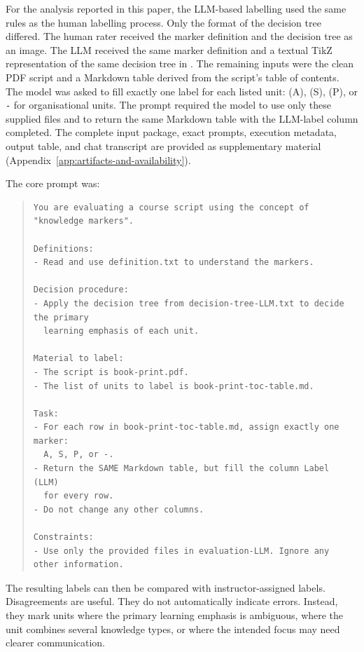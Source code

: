 \documentclass{article}
\begin{document}
For the analysis reported in this paper, the LLM-based labelling used the same rules as the human labelling process. Only the format of the decision tree differed. The human rater received the marker definition and the decision tree as an image. The LLM received the same marker definition and a textual TikZ representation of the same decision tree in . The remaining inputs were the clean PDF script and a Markdown table derived from the script's table of contents. The model was asked to fill exactly one label for each listed unit: (A), (S), (P), or \texttt{-} for organisational units. The prompt required the model to use only these supplied files and to return the same Markdown table with the LLM-label column completed. The complete input package, exact prompts, execution metadata, output table, and chat transcript are provided as supplementary material (Appendix~\ref{app:artifacts-and-availability}).\par

The core prompt was:

\begin{quote}
\small
\begin{verbatim}
You are evaluating a course script using the concept of "knowledge markers".

Definitions:
- Read and use definition.txt to understand the markers.

Decision procedure:
- Apply the decision tree from decision-tree-LLM.txt to decide the primary
  learning emphasis of each unit.

Material to label:
- The script is book-print.pdf.
- The list of units to label is book-print-toc-table.md.

Task:
- For each row in book-print-toc-table.md, assign exactly one marker:
  A, S, P, or -.
- Return the SAME Markdown table, but fill the column Label (LLM)
  for every row.
- Do not change any other columns.

Constraints:
- Use only the provided files in evaluation-LLM. Ignore any other information.
\end{verbatim}
\end{quote}

The resulting labels can then be compared with instructor-assigned labels. Disagreements are useful. They do not automatically indicate errors. Instead, they mark units where the primary learning emphasis is ambiguous, where the unit combines several knowledge types, or where the intended focus may need clearer communication.
\end{document}
